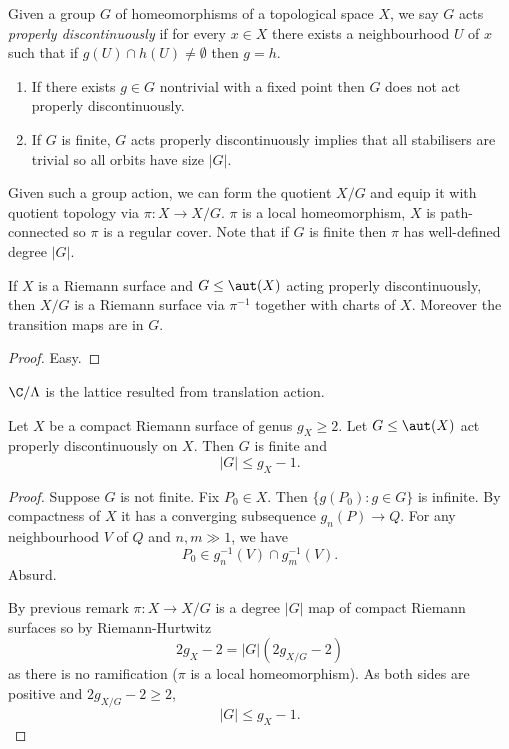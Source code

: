 \documentclass[a4paper]{article}
\begin{document}
\begin{definition}
  Given a group \(G\) of homeomorphisms of a topological space \(X\), we say \(G\) acts \emph{properly discontinuously} if for every \(x \in X\) there exists a neighbourhood \(U\) of \(x\) such that if \(g(U) \cap h(U) \neq \emptyset\) then \(g = h\).
\end{definition}

\begin{remark}\leavevmode
  \begin{enumerate}
  \item If there exists \(g \in G\) nontrivial with a fixed point then \(G\) does not act properly discontinuously.
  \item If \(G\) is finite, \(G\) acts properly discontinuously implies that all stabilisers are trivial so all orbits have size \(|G|\).
  \end{enumerate}
\end{remark}

Given such a group action, we can form the quotient \(X/G\) and equip it with quotient topology via \(\pi: X \to X/G\). \(\pi\) is a local homeomorphism, \(X\) is path-connected so \(\pi\) is a regular cover. Note that if \(G\) is finite then \(\pi\) has well-defined degree \(|G|\).

\begin{lemma}
  If \(X\) is a Riemann surface and \(G \leq \aut(X)\) acting properly discontinuously, then \(X/G\) is a Riemann surface via \(\pi^{-1}\) together with charts of \(X\). Moreover the transition maps are in \(G\).
\end{lemma}

\begin{proof}
  Easy.
\end{proof}

\begin{eg}
  \(\C/\Lambda\) is the lattice resulted from translation action.
\end{eg}

\begin{proposition}[Hurwitz]
  Let \(X\) be a compact Riemann surface of genus \(g_X \geq 2\). Let \(G \leq \aut(X)\) act properly discontinuously on \(X\). Then \(G\) is finite and
  \[
    |G| \leq g_X - 1.
  \]
\end{proposition}

\begin{proof}
  Suppose \(G\) is not finite. Fix \(P_0 \in X\). Then \(\{g(P_0): g \in G\}\) is infinite. By compactness of \(X\) it has a converging subsequence \(g_n(P) \to Q\). For any neighbourhood \(V\) of \(Q\) and \(n, m \gg 1\), we have
  \[
    P_0 \in g_n^{-1}(V) \cap g_m^{-1}(V).
  \]
  Absurd.

  By previous remark \(\pi: X \to X/G\) is a degree \(|G|\) map of compact Riemann surfaces so by Riemann-Hurtwitz
  \[
    2g_X - 2 = |G| (2g_{X/G} - 2)
  \]
  as there is no ramification (\(\pi\) is a local homeomorphism). As both sides are positive and \(2g_{X/G} - 2 \geq 2\),
  \[
    |G| \leq g_X - 1.
  \]
\end{proof}
\end{document}
